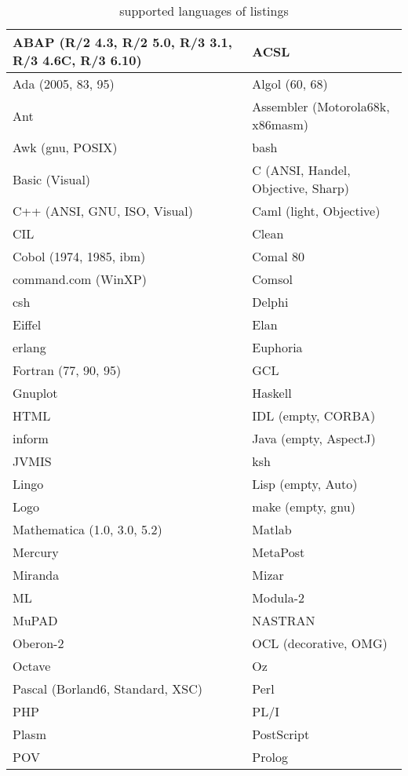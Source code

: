 \begin{center}
	\begin{longtable}{l|l}
		\caption{supported languages of listings} \label{longtable: supported languages of listings} \\
		ABAP (R/2 4.3, R/2 5.0, R/3 3.1, R/3 4.6C, R/3 6.10)	& ACSL \\
		\hline
		Ada (2005, 83, 95)	& Algol (60, 68)\\
		\hline
		Ant	& Assembler (Motorola68k, x86masm)\\
		\hline
		Awk (gnu, POSIX)	& bash\\
		\hline
		Basic (Visual)	& C (ANSI, Handel, Objective, Sharp)\\
		\hline
		C++ (ANSI, GNU, ISO, Visual)	& Caml (light, Objective)\\
		\hline
		CIL	& Clean\\
		\hline
		Cobol (1974, 1985, ibm)	& Comal 80 \\
		\hline
		command.com (WinXP)	& Comsol  \\
		\hline
		csh	& Delphi  \\
		\hline
		Eiffel	& Elan  \\
		\hline
		erlang	& Euphoria\\
		\hline
		Fortran (77, 90, 95)	& GCL\\
		\hline
		Gnuplot	& Haskell\\
		\hline
		HTML	& IDL (empty, CORBA)\\
		\hline
		inform	& Java (empty, AspectJ)\\
		\hline
		JVMIS	& ksh\\
		\hline
		Lingo	& Lisp (empty, Auto)\\
		\hline
		Logo	& make (empty, gnu)\\
		\hline
		Mathematica (1.0, 3.0, 5.2)	& Matlab\\
		\hline
		Mercury	& MetaPost\\
		\hline
		Miranda	& Mizar\\
		\hline
		ML	& Modula-2\\
		\hline
		MuPAD	& NASTRAN\\
		\hline
		Oberon-2	& OCL (decorative, OMG)\\
		\hline
		Octave	& Oz\\
		\hline
		Pascal (Borland6, Standard, XSC)	& Perl\\
		\hline
		PHP	& PL/I\\
		\hline
		Plasm	& PostScript\\
		\hline
		POV	& Prolog\\

\end{longtable}
\end{center}
